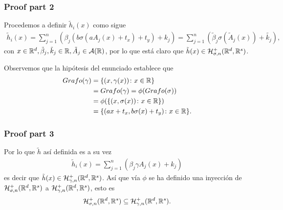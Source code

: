 \begin{frame}
    \frametitle{Proof part 2}

       Procedemos a definir $\tilde{h}_i(x)$ como sigue 
       \begin{align}\label{eq:h-tilda-definition}
           \tilde{h}_i(x) 
           = \sum^n_{j=1}(\beta_{j}  (b \sigma( a A_j(x) + t_x) + t_y)+ k_j)
           = \sum^n_{j=1}(\tilde{\beta}_{j} \sigma(\tilde{A}_j(x))+ \tilde{k_j}),
       \end{align}
       con $x \in \mathbb{R}^d, \tilde \beta_{j}, \tilde k_j \in \mathbb{R}, \tilde{A}_j \in \mathcal{A}(\mathbb{R})$,
       por lo que está claro que $\tilde{h}(x) \in \mathcal{H}^+_{\sigma, n}(\mathbb{R}^d, \mathbb{R}^s)$. 
    
       Observemos que la 
       hipótesis del enunciado 
       establece que
       \begin{align}
           Grafo(\gamma) &= \{ (x, \gamma(x)) \colon x \in \mathbb{R} \} 
           \\
           & = 
           Grafo(\gamma)  = \phi(Grafo(\sigma)) 
           \\
           & = 
           \phi( \{ (x, \sigma(x)) \colon x \in \mathbb{R} \})
           \\
           &=
           \{ (a x + t_x, b \sigma(x) + t_y) \colon x \in \mathbb{R} \}.
       \end{align}

\end{frame}


\begin{frame}
    \frametitle{Proof part 3}

    Por lo que $\tilde{h}$ así definida 
    es a su vez 
    \begin{align}
        \tilde{h}_i(x) 
        = \sum^n_{j=1}(\beta_{j}  \gamma A_j(x)+ k_j)
    \end{align}
     es decir que $\tilde{h}(x) \in \mathcal{H}^+_{\gamma, n}(\mathbb{R}^d, \mathbb{R}^s)$. 
    Así que vía $\phi$ se ha definido una inyección 
    de $\mathcal{H}^+_{\sigma, n}(\mathbb{R}^d, \mathbb{R}^s)$ a 
    $\mathcal{H}^+_{\gamma, n}(\mathbb{R}^d, \mathbb{R}^s)$, 
    esto es 
    \begin{equation}
        \mathcal{H}^+_{\sigma, n}(\mathbb{R}^d, \mathbb{R}^s)
        \subseteq
        \mathcal{H}^+_{\gamma, n}(\mathbb{R}^d, \mathbb{R}^s).  
    \end{equation}
\end{frame}


